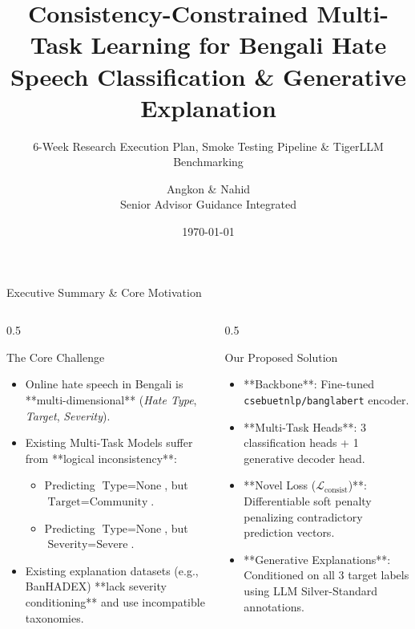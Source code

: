 \documentclass[10pt, aspectratio=169]{beamer}
\title[Consistency-Constrained Bengali Hate Speech MTL]{Consistency-Constrained Multi-Task Learning for Bengali Hate Speech Classification \& Generative Explanation}
\subtitle{6-Week Research Execution Plan, Smoke Testing Pipeline \& TigerLLM Benchmarking}
\author[Research Team]{Angkon \& Nahid \\ \small Senior Advisor Guidance Integrated}
\institute[ICCIT 2026]{Target Venue: ICCIT 2026 (Cox's Bazar) / IEEE Access}
\date{\today}
\begin{document}
\begin{frame}
    \titlepage
\end{frame}

\begin{frame}{Executive Summary \& Core Motivation}
    \begin{columns}
        \begin{column}{0.5\textwidth}
            \begin{block}{The Core Challenge}
                \begin{itemize}
                    \item Online hate speech in Bengali is **multi-dimensional** (\textit{Hate Type}, \textit{Target}, \textit{Severity}).
                    \item Existing Multi-Task Models suffer from **logical inconsistency**:
                    \begin{itemize}
                        \item Predicting $\text{Type} = \text{None}$, but $\text{Target} = \text{Community}$.
                        \item Predicting $\text{Type} = \text{None}$, but $\text{Severity} = \text{Severe}$.
                    \end{itemize}
                    \item Existing explanation datasets (e.g., BanHADEX) **lack severity conditioning** and use incompatible taxonomies.
                \end{itemize}
            \end{block}
        \end{column}
        \begin{column}{0.5\textwidth}
            \begin{block}{Our Proposed Solution}
                \begin{itemize}
                    \item **Backbone**: Fine-tuned \texttt{csebuetnlp/banglabert} encoder.
                    \item **Multi-Task Heads**: 3 classification heads + 1 generative decoder head.
                    \item **Novel Loss ($\mathcal{L}_{\text{consist}}$)**: Differentiable soft penalty penalizing contradictory prediction vectors.
                    \item **Generative Explanations**: Conditioned on all 3 target labels using LLM Silver-Standard annotations.
                \end{itemize}
            \end{block}
        \end{column}
    \end{columns}
\end{frame}
\end{document}
